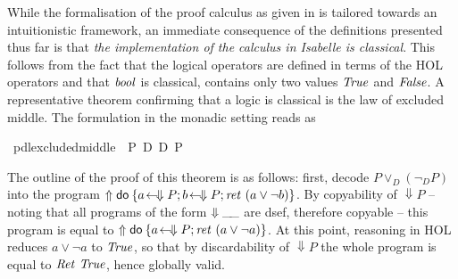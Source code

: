 \begin{rem}
  While the formalisation of the proof calculus as given in
  \cite{SchroederMossakowski:PDL} is tailored towards an intuitionistic
  framework, an immediate consequence of the definitions presented thus far is
  that \emph{the implementation of the calculus in Isabelle is classical}. This
  follows from the fact that the logical operators are defined in terms of the
  HOL operators and that $\mathit{bool}$ is classical, \IE contains only two
  values $\mathit{True}$ and $\mathit{False}$. A representative theorem confirming that a
  logic is classical is the law of excluded middle. The formulation in the
  monadic setting reads as
  \begin{isabellebody} \isanewline
    \ pdl{\isacharunderscore}excluded{\isacharunderscore}middle{\isacharcolon}\ {\isachardoublequote}{\isasymturnstile}\ P\ {\isasymor}\isactrlsub D\ {\isacharparenleft}{\isasymnot}\isactrlsub D\ P{\isacharparenright}{\isachardoublequote}\isanewline
  \end{isabellebody}
  The outline of the proof of this theorem is as follows: first, decode $P \lor_D
  (\lnot_D P)$ into the program $\Uparrow \mathsf{do}\: \{a\!\gets\! \Downarrow P; b\!\gets\! \Downarrow P; \mathit{ret}~(a \lor \lnot b)\}$.
  By copyability of $\Downarrow P$ -- noting that all programs of the form $\Downarrow \_\!\_$ are
  dsef, therefore copyable -- this program is equal to $\Uparrow \mathsf{do}\: \{a\!\gets\! \Downarrow P;
    \mathit{ret}~(a \lor \lnot a)\}$. At this point, reasoning in HOL reduces $a \lor \lnot a$ to
  $\mathit{True}$, so that by discardability of $\Downarrow P$ the whole program is equal to
  $\mathit{Ret}~\mathit{True}$, hence globally valid.
\end{rem}

